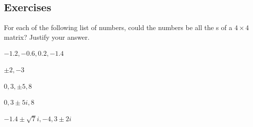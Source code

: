 \begin{draft}

\end{draft}%








\subsection{Exercises}





\begin{exercise} \label{ex:} 
For each of the following list of numbers, could the numbers be all the s of a \(4\times4\) matrix? 
Justify your answer.
\begin{parts}
\item \(-1.2,-0.6,0.2,-1.4\)

\item \(\pm2,-3\)

\item \(0,3,\pm5,8\)

\item \(0,3\pm5i,8\)

\item \(-1.4\pm\sqrt7i,-4,3\pm2i\)

\end{parts}
\end{exercise}






